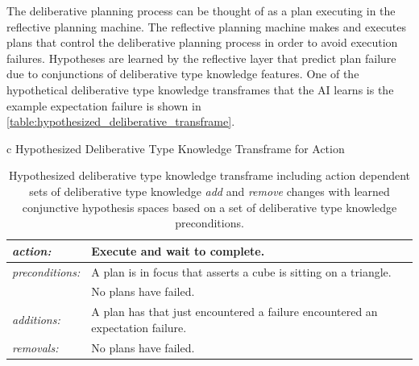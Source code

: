 The deliberative planning process can be thought of as a plan
executing in the reflective planning machine.  The reflective planning
machine makes and executes plans that control the deliberative
planning process in order to avoid execution failures.  Hypotheses are
learned by the reflective layer that predict plan failure due to
conjunctions of deliberative type knowledge features.  One of the
hypothetical deliberative type knowledge transframes that the AI
learns is the example expectation failure is shown in
{\mbox{\autoref{table:hypothesized_deliberative_transframe}}}.
\begin{table}[h]
\centering
\begin{tabular}{c}
  Hypothesized Deliberative Type Knowledge Transframe for Action \\
  \begin{tabular}{|l|p{8cm}|}
    \hline
    \emph{action:}        & Execute and wait to complete. \\
    \hline
    \emph{preconditions:} & A plan is in focus that asserts a cube is sitting on a triangle. \\
    ~                     & No plans have failed. \\
    \hline
    \emph{additions:}     & A plan has that just encountered a failure encountered an expectation failure. \\
    \hline
    \emph{removals:}      & No plans have failed. \\
    \hline
  \end{tabular}
\end{tabular}
\caption[Hypothesized deliberative type knowledge transframe for
  action.]{Hypothesized deliberative type knowledge transframe
  including action dependent sets of deliberative type knowledge
  \emph{add} and \emph{remove} changes with learned conjunctive
  hypothesis spaces based on a set of deliberative type knowledge
  preconditions.}
\label{table:hypothesized_deliberative_transframe}
\end{table}
